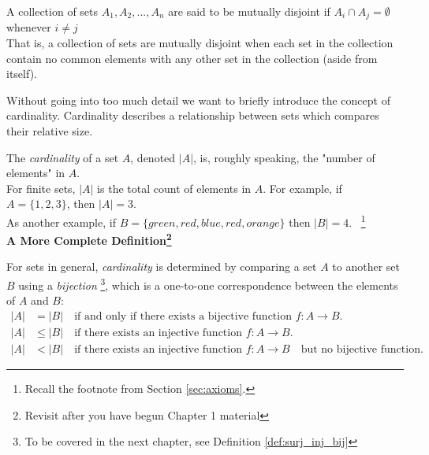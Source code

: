 \begin{definition}
    A collection of sets $A_1,A_2,...,A_n$ are said to be mutually disjoint if $A_i\cap A_j=\emptyset$ whenever $i\neq j$ \\

    \noindent That is, a collection of sets are mutually disjoint when each set in the collection contain no common elements with any other set in the collection (aside from itself).
\end{definition}
\newpage
Without going into too much detail we want to briefly introduce the concept of cardinality. Cardinality describes a relationship between sets which compares their relative size.
\begin{definition}
    The \textit{cardinality} of a set \(A\), denoted \(|A|\), is, roughly speaking, the "number of elements" in \(A\). \\

    \noindent For finite sets, \(|A|\) is the total count of elements in \(A\). For example, if \(A = \{1, 2, 3\}\), then \(|A| = 3\). \\
    \noindent As another example, if \(B=\{green, red, blue, red, orange\}\) then $|B|=4$. \ \footnote{Recall the footnote from Section \ref{sec:axioms}.}\\ 
    
    \noindent \textbf{A More Complete Definition\footnote{Revisit after you have begun Chapter 1 material}} \\ \steezybreak

    \noindent For sets in general, \textit{cardinality} is determined by comparing a set \(A\) to another set \(B\) using a \textit{bijection} \footnote{To be covered in the next chapter, see Definition \ref{def:surj_inj_bij}}, which is a one-to-one correspondence between the elements of \(A\) and \(B\):
    \begin{align}
        |A| &= |B| \quad \text{if and only if there exists a bijective function } f: A \to B. \nonumber \\
        |A|&\leq |B| \quad \text{if there exists an injective function }f:A \to B. \nonumber \\
        |A|&<|B| \quad \text{if there exists an injective function } f:A \to B \quad \text{but no bijective function.} \nonumber
    \end{align}
\end{definition}

